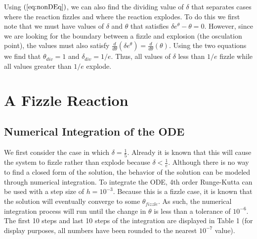 \documentclass[12pt]{article}\pagestyle{myheadings}
\theoremstyle{plain}
\begin{document}
\vspace{5mm}

Using $(\ref{eq:nonDEq})$, we can also find the dividing value of $\delta$ that separates cases where the reaction fizzles and where the reaction explodes. To do this we first note that we must have values of  $\delta$ and $\theta$ that satisfies $\delta e^{\theta} - \theta = 0$. However, since we are looking for the boundary between a fizzle and explosion (the osculation point), the values must also satisfy $\frac{d}{d\theta}\left(\delta e^{\theta} \right) = \frac{d}{d\theta}\left(\theta \right)$. Using the two equations we find that $\theta_{div} = 1$ and $\delta_{div} = 1/e$. Thus, all values of $\delta$ less than $1/e$ fizzle while all values greater than $1/e$ explode.

\section{A Fizzle Reaction}
\subsection{Numerical Integration of the ODE}
We first consider the case in which $\delta = \frac{1}{5}$. Already it is known that this will cause the system to fizzle rather than explode because $\delta < \frac{1}{e}$. Although there is no way to find a closed form of the solution, the behavior of the solution can be modeled through numerical integration. To integrate the ODE, 4th order Runge-Kutta can be used with a step size of $h = 10^{-3}$. Because this is a fizzle case, it is known that the solution will eventually converge to some $\theta_{fizzle}$. As such, the numerical integration process will run until the change in $\theta$ is less than a tolerance of $10^{-6}$. The first 10 steps and last 10 steps of the integration are displayed in Table 1 (for display purposes, all numbers have been rounded to the nearest $10^{-7}$ value).
\end{document}
